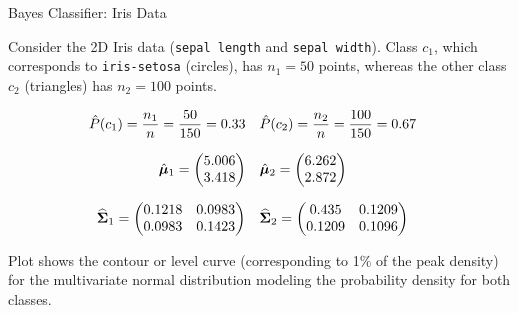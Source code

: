 \begin{frame}{Bayes Classifier: Iris Data}

	Consider the 2D Iris data ({\tt sepal
	length} and {\tt sepal width}).
Class $c_1$, which
    corresponds to
    {\tt iris-setosa} (circles), has $n_1=50$ points,
    whereas the other
    class $c_2$ (triangles) has $n_2=100$ points.

    \begin{align*}
    \hat{P}(c_1) & = {n_1\over n} = {50 \over 150} = 0.33
    & \hat{P}(c_2) & = {n_2 \over n} = {100 \over 150} = 0.67
    \end{align*}

    \begin{align*}
    \hat{{\bm \mu}}_1 & = \begin{pmatrix} 5.006\\3.418 \end{pmatrix}
    & \hat{{\bm \mu}}_2 & = \begin{pmatrix} 6.262\\2.872 \end{pmatrix}
    \end{align*}

    \begin{align*}
        \widehat{{\bm \Sigma}}_1 & = \begin{pmatrix} 0.1218 & 0.0983 \\ 0.0983 & 0.1423  \end{pmatrix}
        & \widehat{{\bm \Sigma}}_2 & = \begin{pmatrix} 0.435 & 0.1209 \\ 0.1209 & 0.1096 \end{pmatrix} 
    \end{align*}

    Plot shows the contour or level
    curve (corresponding to 1\% of the peak density) for the
    multivariate normal distribution modeling the probability density
    for both classes.

\end{frame}


